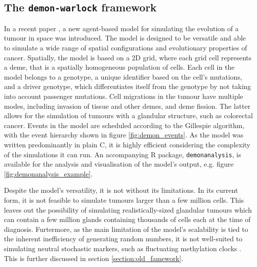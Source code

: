 \subsection{The \texttt{demon-warlock} framework}
In a recent paper \cite{bak_warlock_2023}, a new agent-based model for
simulating the evolution of a tumour in space was introduced. The model is
designed to be versatile and able to simulate a wide range of spatial
configurations and evolutionary properties of cancer. Spatially, the model is
based on a 2D grid, where each grid cell represents a deme, that is a spatially
homogeneous population of cells. Each cell in the model belongs to a genotype,
a unique identifier based on the cell's mutations, and a driver genotype, which
differentiates itself from the genotype by not taking into account passenger
mutations. Cell migrations in the tumour have multiple modes, including
invasion of tissue and other demes, and deme fission. The latter allows for the
simulation of tumours with a glandular structure, such as colorectal cancer.
Events in the model are scheduled according to the Gillespie algorithm, with
the event hierarchy shown in figure \ref{fig:demon_events}. As the model was
written predominantly in plain C, it is highly efficient considering the
complexity of the simulations it can run. An accompanying R package,
\texttt{demonanalysis}, is available for the analysis and visualisation of the
model's output, e.g. figure \ref{fig:demonanalysis_example}. \par Despite the
model's versatility, it is not without its limitations. In its current form, it
is not feasible to simulate tumours larger than a few million cells. This
leaves out the possibility of simulating realistically-sized glandular tumours
which can contain a few million glands containing thousands of cells each at
the time of diagnosis. Furtermore, as the main limitation of the model's
scalability is tied to the inherent inefficiency of generating random numbers,
it is not well-suited to simulating neutral stochastic markers, such as
fluctuating methylation clocks \cite{gabbutt_fluctuating_2022}. This is further
discussed in section \ref{section:old_famework}.

